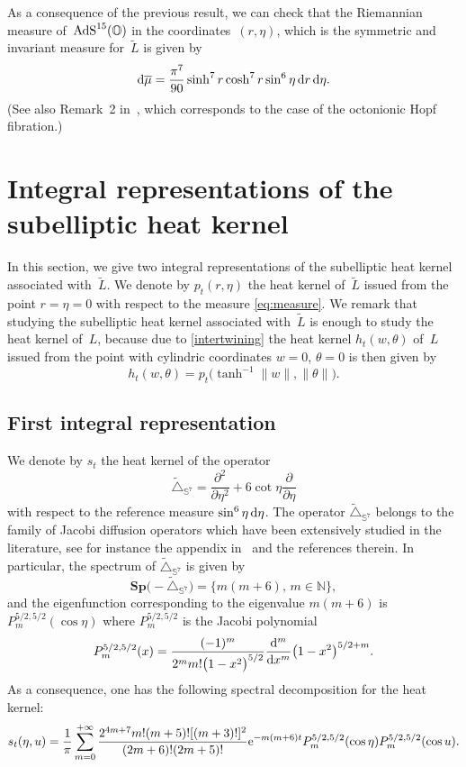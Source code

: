 \documentclass[10pt,a4paper]{amsart}
\numberwithin{equation}{section}
\begin{document}
\begin{Remark}As a consequence of the previous result, we can check that the Riemannian measure of~${\rm AdS}^{15}(\mathbb{O})$ in the coordinates~$(r,\eta)$, which is the symmetric and invariant measure for~$\tilde{L}$ is given by
\begin{equation}\label{eq:measure}
{\rm d}\overline{\mu}=\frac{{\pi}^7}{90}\sinh^7 r \cosh^7r\sin^6 \eta \, {\rm d}r \,{\rm d}\eta.
\end{equation}
(See also Remark~2 in~\cite{FBGC19}, which corresponds to the case of the octonionic Hopf fibration.)
\end{Remark}

\section{Integral representations of the subelliptic heat kernel}\label{section4}

In this section, we give two integral representations of the subelliptic heat kernel associated with~$\tilde{L}$. We denote by $p_t(r,\eta)$ the heat kernel of~$\tilde{L}$ issued from the point $r=\eta=0$ with respect to the measure \eqref{eq:measure}. We remark that studying the subelliptic heat kernel associated with~$\tilde{L}$ is enough to study the heat kernel of~$L$, because due to \eqref{intertwining} the heat kernel $h_t(w,\theta)$ of~$L$ issued from the point with cylindric coordinates $w=0$, $\theta=0$ is then given by
\[
h_t(w,\theta)=p_t\big( \tanh^{-1} \| w \|, \| \theta \|\big).
\]

\subsection{First integral representation}\label{section4.1}

We denote by $s_t$ the heat kernel of the operator
\begin{equation*}
\tilde{\triangle}_{\mathbb{S}^7}=\frac{{\partial}^2}{\partial {\eta}^2}+6\cot \eta\frac{{\partial}}{\partial {\eta}}
\end{equation*}
with respect to the reference measure $\sin^6\eta \, {\rm d}\eta$. The operator $\tilde{\triangle}_{\mathbb{S}^7}$ belongs to the family of Jacobi diffusion operators which have been extensively studied in the literature, see for instance the appendix in~\cite{MR3719061} and the references therein. In particular, the spectrum of $\tilde{\triangle}_{\mathbb{S}^7}$ is given by
\[
\mathbf{Sp} \big({-} \tilde{\triangle}_{\mathbb{S}^7}\big)= \{ m(m+6),\, m \in \mathbb{N} \},
\]
and the eigenfunction corresponding to the eigenvalue $m(m+6)$ is $P^{5/2,5/2}_m (\cos \eta)$ where $P^{5/2,5/2}_m$ is the Jacobi polynomial
\[
P_m^{5/2,5/2}(x)=\frac{(-1)^m}{2^mm!\big(1-x^2\big)^{5/2}}\frac{{\rm d}^m}{{\rm d}x^m}\big(1-x^2\big)^{5/2+m}.
\]
As a consequence, one has the following spectral decomposition for the heat kernel:
\begin{gather*}
s_t(\eta,u)
 =\frac{1}{{\pi}} \sum_{m=0}^{+\infty} \frac{2^{4m+7} m !(m+5)![(m+3)!]^2}{(2m+6)!(2m+5)!} {\rm e}^{-m(m+6)t}P_m^{5/2,5/2}(\cos \eta )P_m^{5/2,5/2}(\cos u).
\end{gather*}
\end{document}
